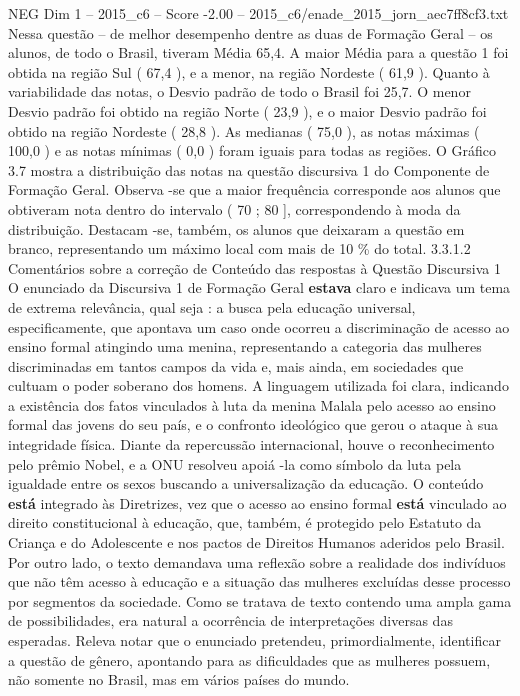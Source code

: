 \begin{textsample}{NEG Dim 1 – 2015\_c6 – Score -2.00 – 2015\_c6/enade\_2015\_jorn\_aec7ff8cf3.txt}
Nessa questão – de melhor desempenho dentre as duas de Formação Geral – os alunos, de todo o Brasil, tiveram Média 65,4.
A maior Média para a questão 1 foi obtida na região Sul ( 67,4 ), e a menor, na região Nordeste ( 61,9 ).
Quanto à variabilidade das notas, o Desvio padrão de todo o Brasil foi 25,7.
O menor Desvio padrão foi obtido na região Norte ( 23,9 ), e o maior Desvio padrão foi obtido na região Nordeste ( 28,8 ).
As medianas ( 75,0 ), as notas máximas ( 100,0 ) e as notas mínimas ( 0,0 ) foram iguais para todas as regiões.
O Gráfico 3.7 mostra a distribuição das notas na questão discursiva 1 do Componente de Formação Geral.
Observa -se que a maior frequência corresponde aos alunos que obtiveram nota dentro do intervalo ( 70 ; 80 ], correspondendo à moda da distribuição.
Destacam -se, também, os alunos que deixaram a questão em branco, representando um máximo local com mais de 10 \% do total. 3.3.1.2 Comentários sobre a correção de Conteúdo das respostas à Questão Discursiva 1 O enunciado da Discursiva 1 de Formação Geral \textbf{estava} claro e indicava um tema de extrema relevância, qual seja : a busca pela educação universal, especificamente, que apontava um caso onde ocorreu a discriminação de acesso ao ensino formal atingindo uma menina, representando a categoria das mulheres discriminadas em tantos campos da vida e, mais ainda, em sociedades que cultuam o poder soberano dos homens.
A linguagem utilizada foi clara, indicando a existência dos fatos vinculados à luta da menina Malala pelo acesso ao ensino formal das jovens do seu país, e o confronto ideológico que gerou o ataque à sua integridade física.
Diante da repercussão internacional, houve o reconhecimento pelo prêmio Nobel, e a ONU resolveu apoiá -la como símbolo da luta pela igualdade entre os sexos buscando a universalização da educação.
O conteúdo \textbf{está} integrado às Diretrizes, vez que o acesso ao ensino formal \textbf{está} vinculado ao direito constitucional à educação, que, também, é protegido pelo Estatuto da Criança e do Adolescente e nos pactos de Direitos Humanos aderidos pelo Brasil.
Por outro lado, o texto demandava uma reflexão sobre a realidade dos indivíduos que não têm acesso à educação e a situação das mulheres excluídas desse processo por segmentos da sociedade.
Como se tratava de texto contendo uma ampla gama de possibilidades, era natural a ocorrência de interpretações diversas das esperadas.
Releva notar que o enunciado pretendeu, primordialmente, identificar a questão de gênero, apontando para as dificuldades que as mulheres possuem, não somente no Brasil, mas em vários países do mundo.

\end{textsample}
